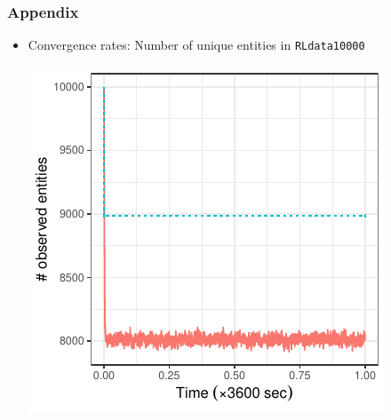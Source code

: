 \documentclass[9pt]{beamer}
\begin{document}

\begin{frame}
\frametitle{Appendix}

\begin{itemize}
\item Convergence rates: Number of unique entities in \texttt{RLdata10000}
\begin{center}
  \includegraphics[width=\linewidth,height=0.8\textheight,keepaspectratio]{./figs/convergence-num-ent-blink-dblink-rldata10000.pdf} 
\end{center}
\end{itemize}
\end{frame}
\end{document}
